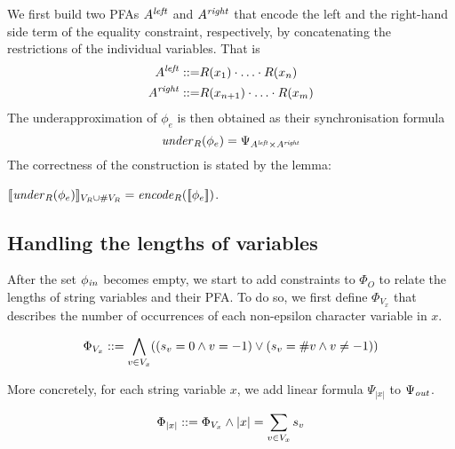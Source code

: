 \documentclass[sigplan,review,anonymous]{acmart}\settopmatter{printfolios=true,printccs=false,printacmref=false}
\begin{document}
We first build two PFAs $A^{\mathit{left}}$ and $A^{\mathit{right}}$ that encode the left and the right-hand side term of the equality constraint, respectively, by concatenating the restrictions of the individual variables. That is
\begin{eqnarray*}
A^{\mathit{left}} ::=& R(x_1)\cdot\ldots \cdot R(x_n)\\
A^{\mathit{right}} ::=& R(x_{n+1})\cdot\ldots \cdot R(x_m)
\end{eqnarray*}
The underapproximation of $\phi_e$ is then obtained as their synchronisation formula
$$
\mathit{under}_R(\phi_e) = \Psi_{A^{\mathit{left}} \times A^{\mathit{right}}}
$$
The correctness of the construction is stated by the lemma:
\begin{lemma}\label{lemma:eqcorrect}
$[\![\mathit{under}_R(\phi_e)]\!]_{V_R \cup \#V_R} = \mathit{encode}_{R} ([\![\phi_e]\!])$.
\end{lemma}

\subsection{Handling the lengths of variables}
After the set $\phi_{\mathit{in}}$ becomes empty, we start to add constraints to $\Phi_O$ to relate the lengths of string variables and their PFA. To do so, we first define $\Phi_{V_x}$ that describes the number of occurrences of each non-epsilon character variable in $x$.

$$\Phi_{V_x} ::= \bigwedge_{v\in V_x} ( (s_v = 0 \wedge v = -1) \vee (s_v = \#v \wedge v \neq -1)) $$


More concretely, for each string variable $x$, we add linear formula $\Psi_{|x|}$ to $\Psi_{\mathit{out}}$. 

$$\Phi_{|x|} ::= \Phi_{V_x} \wedge |x| = \sum_{v\in V_x} s_v $$


\end{document}
